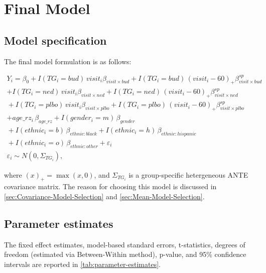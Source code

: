 \documentclass[12pt]{article}
\begin{document}
\section{Final Model}

\subsection{Model specification}

The final model formulation is as follows:

\begin{multline}
\label{eq:final-model}
Y_{i} = \beta_{0} + I(TG_i = bud)\,visit_{i}\beta_{visit \times bud}
+ I(TG_i = bud)\,(visit_{i} - 60)_{+}\beta_{visit \times bud}^{sp}\\
+ I(TG_i = ned)\,visit_{i}\beta_{visit \times ned} 
+ I(TG_i = ned)\,(visit_{i} - 60)_{+}\beta_{visit \times ned}^{sp} \\
{}+ I(TG_i = plbo)\,visit_{i}\beta_{visit \times plbo}
+ I(TG_i = plbo)\,(visit_{i} - 60)_{+}\beta_{visit \times plbo}^{sp}\\
+ age\_rz_{i}\,\beta_{age\_rz}
+ I(gender_{i} = m)\,\beta_{gender}\\
{}+ I(ethnic_{i} = b)\,\beta_{ethnic:black}
+ I(ethnic_{i} = h)\,\beta_{ethnic:hispanic}\\
{}+ I(ethnic_{i} = o)\,\beta_{ethnic:other}
+ \varepsilon_{i}\\
\varepsilon_{i} \sim N(0,\Sigma_{TG_i}),
\end{multline}

where $(x)_{+} = \max(x, 0)$, and
$\Sigma_{TG_i}$ is a group-specific hetergeneous ANTE covariance matrix.
The reason for choosing this model is discussed in 
\cref{sec:Covariance-Model-Selection} and 
\cref{sec:Mean-Model-Selection}.


\subsection{Parameter estimates}

The fixed effect estimates, model-based standard errors,
t-statistics, degrees of freedom (estimated via Between-Within method),
p-value, and 95\% confidence intervals are reported
in \cref{tab:parameter-estimates}.

\begin{table}[htbp]
\caption{Parameter estimates of the final model}
\label{tab:parameter-estimates}
\centering
{}
\end{table}
\end{document}
